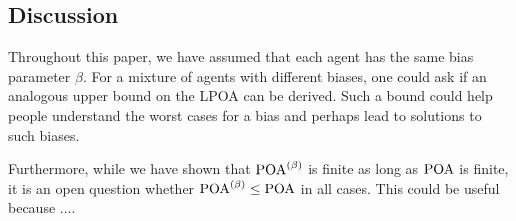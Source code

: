 \documentclass[twoside]{article}
\begin{document}
\begin{multicols}{2}

\section{Discussion}
Throughout this paper, we have assumed that each agent has the same bias
parameter $\beta$. For a mixture of agents with different biases, one could ask
if an analogous upper bound on the LPOA can be derived.  Such a bound could help people understand the worst cases for a bias and perhaps lead to solutions to such biases.

Furthermore, while we have shown that $\text{POA}^{(\beta)}$ is finite as long as $\text{POA}$ is
finite, it is an open question whether $\text{POA}^{(\beta)} \le \text{POA}$ in all cases.  This could be useful because .... 


\end{multicols}
\end{document}
